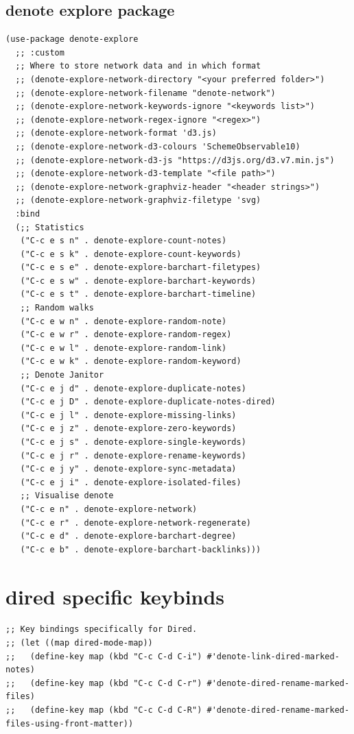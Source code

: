 \documentclass[11pt]{article}
\begin{document}
\subsection{denote explore package}
\label{sec:orgc933c22}
\begin{verbatim}
(use-package denote-explore
  ;; :custom
  ;; Where to store network data and in which format
  ;; (denote-explore-network-directory "<your preferred folder>")
  ;; (denote-explore-network-filename "denote-network")
  ;; (denote-explore-network-keywords-ignore "<keywords list>")
  ;; (denote-explore-network-regex-ignore "<regex>")
  ;; (denote-explore-network-format 'd3.js)
  ;; (denote-explore-network-d3-colours 'SchemeObservable10)
  ;; (denote-explore-network-d3-js "https://d3js.org/d3.v7.min.js")
  ;; (denote-explore-network-d3-template "<file path>")
  ;; (denote-explore-network-graphviz-header "<header strings>")
  ;; (denote-explore-network-graphviz-filetype 'svg)
  :bind
  (;; Statistics
   ("C-c e s n" . denote-explore-count-notes)
   ("C-c e s k" . denote-explore-count-keywords)
   ("C-c e s e" . denote-explore-barchart-filetypes)
   ("C-c e s w" . denote-explore-barchart-keywords)
   ("C-c e s t" . denote-explore-barchart-timeline)
   ;; Random walks
   ("C-c e w n" . denote-explore-random-note)
   ("C-c e w r" . denote-explore-random-regex)
   ("C-c e w l" . denote-explore-random-link)
   ("C-c e w k" . denote-explore-random-keyword)
   ;; Denote Janitor
   ("C-c e j d" . denote-explore-duplicate-notes)
   ("C-c e j D" . denote-explore-duplicate-notes-dired)
   ("C-c e j l" . denote-explore-missing-links)
   ("C-c e j z" . denote-explore-zero-keywords)
   ("C-c e j s" . denote-explore-single-keywords)
   ("C-c e j r" . denote-explore-rename-keywords)
   ("C-c e j y" . denote-explore-sync-metadata)
   ("C-c e j i" . denote-explore-isolated-files)
   ;; Visualise denote
   ("C-c e n" . denote-explore-network)
   ("C-c e r" . denote-explore-network-regenerate)
   ("C-c e d" . denote-explore-barchart-degree)
   ("C-c e b" . denote-explore-barchart-backlinks)))
\end{verbatim}
\section{dired specific keybinds}
\label{sec:org2da994a}
\begin{verbatim}
;; Key bindings specifically for Dired.
;; (let ((map dired-mode-map))
;;   (define-key map (kbd "C-c C-d C-i") #'denote-link-dired-marked-notes)
;;   (define-key map (kbd "C-c C-d C-r") #'denote-dired-rename-marked-files)
;;   (define-key map (kbd "C-c C-d C-R") #'denote-dired-rename-marked-files-using-front-matter))
\end{verbatim}
\end{document}
